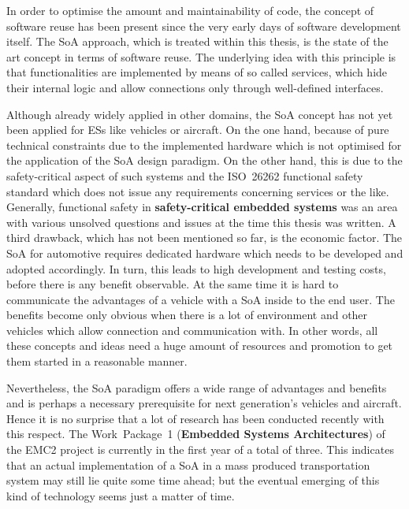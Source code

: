 In order to optimise the amount and maintainability of code, the concept of software reuse has been present since the very early days of software development itself. The SoA approach, which is treated within this thesis, is the state of the art concept in terms of software reuse. The underlying idea with this principle is that functionalities are implemented by means of so called services, which hide their internal logic and allow connections only through well-defined interfaces.

Although already widely applied in other domains, the SoA concept has not yet been applied for ESs like vehicles or aircraft. On the one hand, because of pure technical constraints due to the implemented hardware which is not optimised for the application of the SoA design paradigm. On the other hand, this is due to the safety-critical aspect of such systems and the \mbox{ISO 26262} functional safety standard which does not issue any requirements concerning services or the like. Generally, functional safety in \textbf{safety-critical embedded systems} was an area with various unsolved questions and issues at the time this thesis was written. 
A third drawback, which has not been mentioned so far, is the economic factor. The SoA for automotive requires dedicated hardware which needs to be developed and adopted accordingly. In turn, this leads to high development and testing costs, before there is any benefit observable. At the same time it is hard to communicate the advantages of a vehicle with a SoA inside to the end user. The benefits become only obvious when there is a lot of environment and other vehicles which allow connection and communication with. In other words, all these concepts and ideas need a huge amount of resources and promotion to get them started in a reasonable manner.

Nevertheless, the SoA paradigm offers a wide range of advantages and benefits and is perhaps a necessary prerequisite for next generation's vehicles and aircraft. Hence it is no surprise that a lot of research has been conducted recently with this respect. The \mbox{Work Package 1} (\textbf{Embedded Systems Architectures}) of the EMC2 project is currently in the first year of a total of three. This indicates that an actual implementation of a SoA in a mass produced transportation system may still lie quite some time ahead; but the eventual emerging of this kind of technology seems just a matter of time.